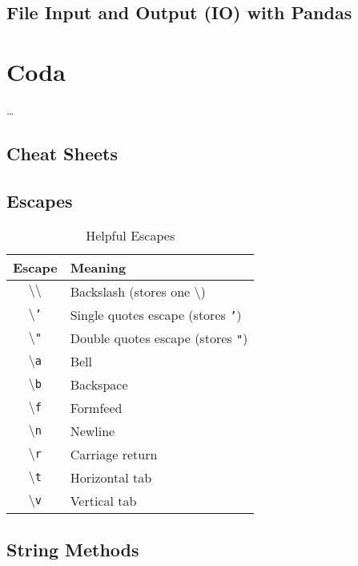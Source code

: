 \documentclass[a4paper,11pt]{book}
\numberwithin{figure}{chapter}
\numberwithin{table}{chapter}
\begin{document}
\section{File Input and Output (IO) with Pandas}
\label{sec:pandas_io}

\theendnotes

\chapter{Coda}
\ldots

\clearpage

\begin{appendices}
\appendixpage
\noappendicestocpagenum
\addappheadtotoc

\chapter{Cheat Sheets}
\label{app:cheatsheets}

\section{Escapes}

\begin{table}[!htbp]
\centering
\caption{Helpful Escapes}
\label{tab:helpful_escapes}
	\begin{tabular}{cl}
		\toprule \toprule
		Escape & Meaning \\
		\midrule
		\texttt{$\setminus\setminus$} & Backslash (stores one $\setminus$) \\
		\texttt{$\setminus$'} & Single quotes escape (stores \texttt{'})\\
		\texttt{$\setminus$"} & Double quotes escape (stores \texttt{"})\\
		\texttt{$\setminus$a} & Bell \\
		\texttt{$\setminus$b} & Backspace \\
		\texttt{$\setminus$f} & Formfeed \\
		\texttt{$\setminus$n} & Newline \\
		\texttt{$\setminus$r} & Carriage return \\
		\texttt{$\setminus$t} & Horizontal tab \\
		\texttt{$\setminus$v} & Vertical tab \\
		\bottomrule
	\end{tabular}
\end{table}
\clearpage

\section{String Methods}


\end{appendices}
\end{document}
